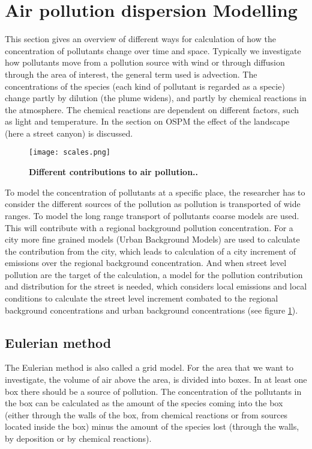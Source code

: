 \section{Air pollution dispersion Modelling}\label{dispersion}
This section gives an overview of different ways for calculation of how the concentration of pollutants change over time and space. Typically we investigate how pollutants move from a pollution source with wind or through diffusion through the area of interest, the general term used is advection. The concentrations of the species (each kind of pollutant is regarded as a specie) change partly by dilution (the plume widens), and partly by chemical reactions in the atmosphere. The chemical reactions are dependent on different factors, such as light and temperature. In the section on OSPM the effect of the landscape (here a street canyon) is discussed.

\begin{figure}[!ht]
\begin{center}
\texttt{[image: scales.png]}
\caption{{\bf Different contributions to air pollution.\cite{Jensen}.}}
\label{scales}
\end{center}
\end{figure}

To model the concentration of pollutants at a specific place, the researcher has to consider the different sources of the pollution as pollution is transported of wide ranges. To model the long range transport of pollutants coarse models are used. This will contribute with a regional background pollution concentration. For a city more fine grained models (Urban Background Models) are used to calculate the contribution from the city, which leads to calculation of a city increment of emissions over the regional background concentration. And when street level pollution are the target of the calculation, a model for the pollution contribution and distribution for the street is needed, which considers local emissions and local conditions to calculate the street level increment combated to the regional background concentrations and urban background concentrations (see figure \ref{scales}).


\subsection{Eulerian method}
The Eulerian method is also called a grid model. For the area that we want to investigate, the volume of air above the area, is divided into boxes. In at least one box there should be a source of pollution. The concentration of the pollutants in the box can be calculated as the amount of the species coming into the box (either through the walls of the box, from chemical reactions or from sources located inside the box) minus the amount of the species lost (through the walls, by deposition or by chemical reactions).

